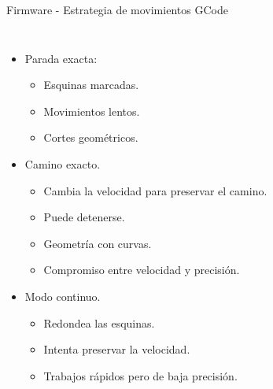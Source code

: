 \documentclass[aspectratio= 43]{beamer}
\begin{document}
\begin{frame}[fragile]{Firmware - Estrategia de movimientos GCode}
   \begin{columns}
      \begin{itemize}
         \item{Parada exacta:}
            \begin{itemize}
               \item{Esquinas marcadas.}
               \item{Movimientos lentos.}
               \item{Cortes geométricos.}
            \end{itemize}
         \item{Camino exacto.}
            \begin{itemize}
               \item{Cambia la velocidad para preservar el camino.}
               \item{Puede detenerse.}
               \item{Geometría con curvas.}
               \item{Compromiso entre velocidad y precisión.}
            \end{itemize}
         \item{Modo continuo.}
            \begin{itemize}
               \item{Redondea las esquinas.}
               \item{Intenta preservar la velocidad.}
               \item{Trabajos rápidos pero de baja precisión.}
            \end{itemize}
      \end{itemize}

\end{columns}
\end{frame}
\end{document}

